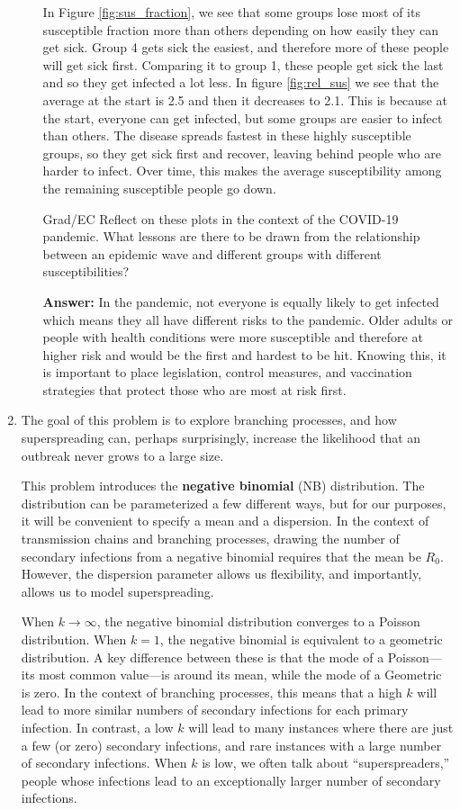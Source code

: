 \documentclass[11pt]{article}
\begin{document}
\begin{enumerate}
\begin{enumerate}[label=\alph*.]
	In Figure \ref{fig:sus_fraction}, we see that some groups lose most of its susceptible fraction more than others depending on how easily they can get sick.
	Group 4 gets sick the easiest, and therefore more of these people will get sick first. Comparing it to group 1, these people get sick the last and so they get infected a lot less.
	In figure \ref{fig:rel_sus} we see that the average at the start is 2.5 and then it decreases to 2.1. This is because at the start, everyone can get infected, but some groups are easier to infect than others. The disease spreads fastest in these highly susceptible groups, so they get sick first and recover, leaving behind people who are harder to infect. Over time, this makes the average susceptibility among the remaining susceptible people go down.
	\item[Grad/EC] Reflect on these plots in the context of the COVID-19 pandemic. What lessons are there to be drawn from the relationship between an epidemic wave and different groups with different susceptibilities?
	\par
	\textbf{Answer:} In the pandemic, not everyone is equally likely to get infected which means they all have different risks to the pandemic.
	Older adults or people with health conditions were more susceptible and therefore at higher risk and would be the first and hardest to be hit.
	Knowing this, it is important to place legislation, control measures, and vaccination strategies that protect those who are most at risk first.
\end{enumerate}
\clearpage

\item The goal of this problem is to explore branching processes, and how superspreading can, perhaps surprisingly, increase the likelihood that an outbreak never grows to a large size.

This problem introduces the {\bf negative binomial} (NB) distribution. The distribution can be parameterized a few different ways, but for our purposes, it will be convenient to specify a mean and a dispersion. In the context of transmission chains and branching processes, drawing the number of secondary infections from a negative binomial requires that the mean be $R_0$. However, the dispersion parameter allows us flexibility, and importantly, allows us to model superspreading. 

When $k \to \infty$, the negative binomial distribution converges to a Poisson distribution. When $k = 1$, the negative binomial is equivalent to a geometric distribution. A key difference between these is that the mode of a Poisson---its most common value---is around its mean, while the mode of a Geometric is zero. In the context of branching processes, this means that a high $k$ will lead to more similar numbers of secondary infections for each primary infection. In contrast, a low $k$ will lead to many instances where there are just a few (or zero) secondary infections, and rare instances with a large number of secondary infections. When $k$ is low, we often talk about ``superspreaders,'' people whose infections lead to an exceptionally larger number of secondary infections. 


\end{enumerate}
\end{document}
